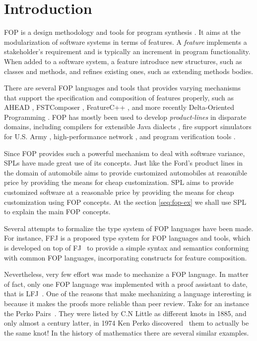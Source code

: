 \chapter{Introduction}
\gls{FOP} \cite{prehofer_feature-oriented_1997} is a design methodology and tools for program synthesis \cite{batory_tutorial_2003}.
It aims at the modularization of software systems in terms of features. A \textit{feature}
implements a stakeholder's requirement and is typically an increment in program functionality.
When added to a software system, a feature introduce new structures, such as classes and methods,
and refines existing ones, such as extending methods bodies.

There are several \gls{FOP} languages and tools that provides varying mechanisms
that support the specification and composition of features properly, such as AHEAD \cite{batory_feature-oriented_2004},
FSTComposer \cite{apel_superimposition:_2008}, FeatureC++ \cite{apel_featurec++:_2005}, and more recently Delta-Oriented Programming \cite{schaefer_delta-oriented_2010}. \gls{FOP} has mostly been used to develop
\textit{product-lines} in disparate domains, including compilers for extensible Java dialects 
\cite{batory_jts:_1998}, fire support simulators for U.S. Army \cite{batory_achieving_2000}, high-performance network
\cite{batory_design_1992}, and program verification tools \cite{kurt_stirewalt_component-based_2001}.

Since \gls{FOP} provides such a powerful mechanism to deal with software variance, \glspl{SPL} have made great use of its concepts.
Just like the Ford's product lines in the domain of automobile aims to provide customized automobiles at reasonible price by providing
the means for cheap customization. \gls{SPL} aims to provide customized software at a reasonable price by providing the means for cheap customization using
\gls{FOP} concepts. At the section \ref{seq:fop-ex} we shall use \gls{SPL} to explain the main \gls{FOP} concepts.

Several attempts to formalize the type system of \gls{FOP} languages have been made. %
For instance,  \gls{FFJ} \cite{apel_feature_2008} is a proposed type system for \gls{FOP} languages and tools, 
which is developed on top of \gls{FJ}~\cite{igarashi_featherweight_2001}
to provide a simple syntax and semantics conforming with common \gls{FOP} languages, 
incorporating constructs for feature composition. %

Nevertheless, very few effort was made to mechanize a \gls{FOP} language. In matter of fact, only one
\gls{FOP} language was implemented with a proof assistant to date, that is \gls{LFJ}~\cite{delaware2009machine}.
One of the reasons that make mechanizing a language interesting is because it makes the proofs more reliable than peer review.
Take for an instance the Perko Pairs~\cite{little1900xxx}. 
They were listed by C.N Little as different knots in 1885, and only almost a century latter, 
in 1974 Ken Perko discovered~\cite{rolfsen1976knots} them to actually be the same knot! In the history of mathematics there
are several similar examples.

